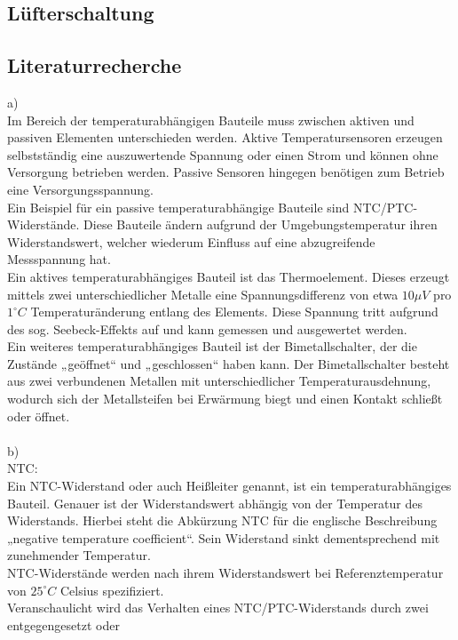 \subsection{Lüfterschaltung}

\subsection{Literaturrecherche}

a)\\
Im Bereich der temperaturabhängigen Bauteile muss zwischen aktiven und passiven Elementen
unterschieden werden. Aktive Temperatursensoren erzeugen selbstständig eine auszuwertende
Spannung oder einen Strom und können ohne Versorgung betrieben werden. Passive Sensoren
hingegen benötigen zum Betrieb eine Versorgungsspannung.\\
Ein Beispiel für ein passive temperaturabhängige Bauteile sind NTC/PTC-Widerstände. Diese Bauteile
ändern aufgrund der Umgebungstemperatur ihren Widerstandswert, welcher wiederum Einfluss auf
eine abzugreifende Messspannung hat.\\
Ein aktives temperaturabhängiges Bauteil ist das Thermoelement. Dieses erzeugt mittels zwei
unterschiedlicher Metalle eine Spannungsdifferenz von etwa $10 \mu V$ pro $1^{\circ} C$ Temperaturänderung
entlang des Elements. Diese Spannung tritt aufgrund des sog. Seebeck-Effekts auf und kann
gemessen und ausgewertet werden.\\
Ein weiteres temperaturabhängiges Bauteil ist der Bimetallschalter, der die Zustände „geöffnet“ und
„geschlossen“ haben kann. Der Bimetallschalter besteht aus zwei verbundenen Metallen mit
unterschiedlicher Temperaturausdehnung, wodurch sich der Metallsteifen bei Erwärmung biegt und
einen Kontakt schließt oder öffnet.\\
\\
b) \\
NTC:\\
Ein NTC-Widerstand oder auch Heißleiter genannt, ist ein temperaturabhängiges Bauteil. Genauer ist
der Widerstandswert abhängig von der Temperatur des Widerstands. Hierbei steht die Abkürzung
NTC für die englische Beschreibung „negative temperature coefficient“. Sein Widerstand sinkt
dementsprechend mit zunehmender Temperatur.\\
NTC-Widerstände werden nach ihrem Widerstandswert bei Referenztemperatur von $25^{\circ} C$ Celsius
spezifiziert.\\
Veranschaulicht wird das Verhalten eines NTC/PTC-Widerstands durch zwei entgegengesetzt oder
